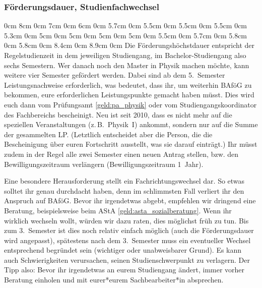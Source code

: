 \begin{multicols}{2}
\subsubsection{Förderungsdauer, Studienfachwechsel}
0cm \columnwidth
0cm 8cm
0cm 7cm
0cm 6cm
0cm 5.7cm
0cm 5.5cm
0cm 5.5cm
0cm 5.5cm
0cm 5.3cm
0cm 5cm
0cm 5cm
0cm 5cm
0cm 5cm
0cm 5.5cm
0cm 5.7cm
0cm 5.8cm
0cm 5.8cm
0cm 8.4cm
0cm 8.9cm
0cm \columnwidth
0cm \columnwidth
0cm \columnwidth
0cm \columnwidth
0cm \columnwidth
0cm \columnwidth
Die Förderungshöchstdauer entspricht der Regelstudienzeit in dem jeweiligen Studiengang, im Bachelor-Studiengang also sechs Semestern.
Wer danach noch den Master in Physik machen möchte, kann weitere vier Semester gefördert werden.
Dabei sind ab dem 5.~Semester Leistungsnachweise erforderlich, was bedeutet, dass ihr, um weiterhin BAföG zu bekommen, eure erforderlichen Leistungspunkte gemacht haben müsst.
Dies wird euch dann vom Prüfungsamt \cref{geld:pa_physik} oder vom Studiengangskoordinator des Fachbereichs bescheinigt.
Neu ist seit 2010, dass es nicht mehr auf die speziellen Veranstaltungen (z.\,B.\ Physik~I) ankommt, sondern nur auf die Summe der gesammelten LP.
(Letztlich entscheidet aber die Person, die die Bescheinigung über euren Fortschritt ausstellt, was sie darauf einträgt.)
Ihr müsst zudem in der Regel alle zwei Semester einen neuen Antrag stellen, bzw. den Bewilligungszeitraum verlängern (Bewilligungszeitraum 1~Jahr).

Eine besondere Herausforderung stellt ein Fachrichtungswechsel dar.
So etwas solltet ihr genau durchdacht haben, denn im schlimmsten Fall verliert ihr den Anspruch auf BAföG.
Bevor ihr irgendetwas abgebt, empfehlen wir dringend eine Beratung, beispielsweise beim AStA \cref{geld:asta_sozialberatung}.
Wenn ihr wirklich wechseln wollt, würden wir dazu raten, dies möglichst früh zu tun.
Bis zum 3.~Semester ist dies noch relativ einfach möglich (auch die Förderungsdauer wird angepasst), spätestens nach dem 3.~Semester muss ein eventueller Wechsel entsprechend begründet sein (wichtiger oder unabweisbarer Grund).
Es kann auch Schwierigkeiten verursachen, seinen Studienschwerpunkt zu verlagern.
Der Tipp also:
Bevor ihr irgendetwas an eurem Studiengang ändert, immer vorher Beratung einholen und mit eurer*eurem Sachbearbeiter*in absprechen.


\end{multicols}
